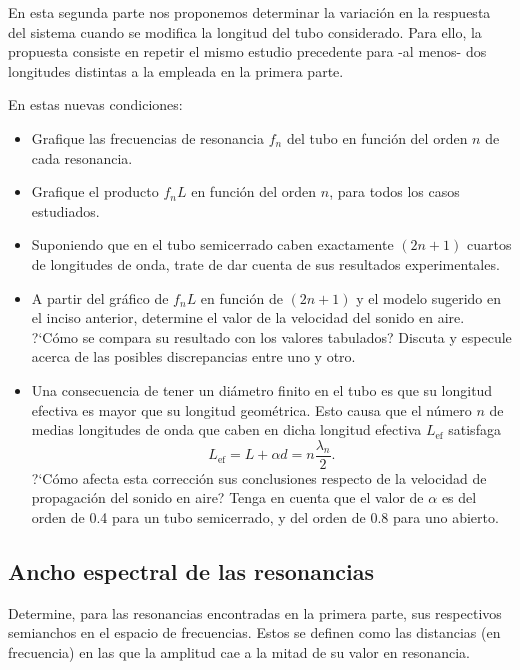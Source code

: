 \documentclass[laboratorio]{guia}
\begin{document}
En esta segunda parte nos proponemos determinar la variaci\'on en la respuesta
del sistema cuando se modifica la longitud del tubo considerado. Para ello, la
propuesta consiste en repetir el mismo estudio precedente para -al menos- dos
longitudes distintas a la empleada en la primera parte.


En estas nuevas condiciones:
\begin{itemize}
    \item Grafique las frecuencias de resonancia $f_n$ del tubo en funci\'on
        del orden $n$ de cada resonancia.
    \item Grafique el producto $f_nL$ en funci\'on del orden $n$, para todos
        los casos estudiados.
    \item Suponiendo que en el tubo semicerrado caben exactamente $(2n+1)$
        cuartos de longitudes de onda, trate de dar cuenta de sus resultados
        experimentales.
    \item A partir del gr\'afico de $f_nL$ en funci\'on de $(2n+1)$ y el modelo
        sugerido en el inciso anterior, determine el valor de la velocidad del
        sonido en aire. ?`C\'omo se compara su resultado con los valores
        tabulados? Discuta y especule acerca de las posibles discrepancias
        entre uno y otro. 
    \item Una consecuencia de tener un di\'ametro finito en el tubo es que su
        longitud efectiva es mayor que su longitud geom\'etrica. Esto causa que
        el n\'umero $n$ de medias longitudes de onda que caben en dicha
        longitud efectiva $L_\text{ef}$ satisfaga
        \begin{equation*}
            L_\text{ef} = L + \alpha d = n \frac{\lambda_n}{2}.
        \end{equation*}
        ?`C\'omo afecta esta correcci\'on sus conclusiones respecto de la
        velocidad de propagaci\'on del sonido en aire? Tenga en cuenta que el valor de $\alpha$ es del
        orden de 0.4 para un tubo semicerrado, y del orden de 0.8 para uno
        abierto.
\end{itemize}

\subsection{Ancho espectral de las resonancias}

Determine, para las resonancias encontradas en la primera parte, sus
respectivos semianchos en el espacio de frecuencias. Estos se definen como las
distancias (en frecuencia) en las que la amplitud cae a la mitad de su valor en
resonancia.
\end{document}

